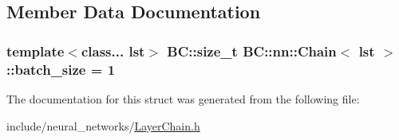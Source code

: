 \subsection{Member Data Documentation}
\subsubsection[{\texorpdfstring{batch\+\_\+size}{batch_size}}]{\setlength{\rightskip}{0pt plus 5cm}template$<$class... lst$>$ {\bf B\+C\+::size\+\_\+t} {\bf B\+C\+::nn\+::\+Chain}$<$ lst $>$\+::batch\+\_\+size = 1}\hypertarget{structBC_1_1nn_1_1Chain_ab36fdf102bb73c6c0f22aa8ede632fd9}{}\label{structBC_1_1nn_1_1Chain_ab36fdf102bb73c6c0f22aa8ede632fd9}


The documentation for this struct was generated from the following file\+:\begin{DoxyCompactItemize}
\item 
include/neural\+\_\+networks/\hyperlink{LayerChain_8h}{Layer\+Chain.\+h}\end{DoxyCompactItemize}
